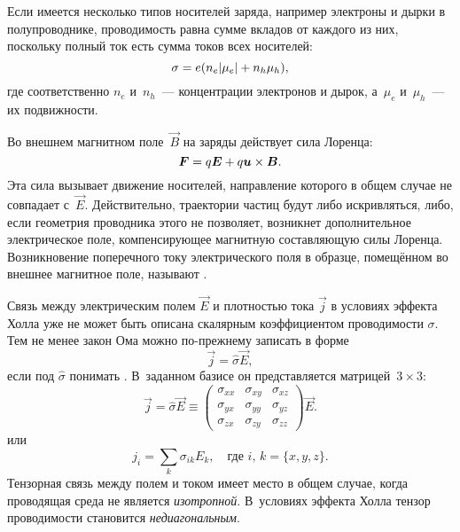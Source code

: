 Если имеется несколько типов носителей заряда, например электроны
и дырки в полупроводнике, проводимость равна сумме вкладов от каждого из них,
поскольку полный ток есть сумма токов всех носителей:
\begin{equation}
    \eqmark{3.27}
    \sigma= e (n_e |\mu_e| +n_h \mu_h),
\end{equation}
где соответственно $n_e$ и~$n_h$~--- концентрации электронов и дырок,
а~$\mu_e$ и~$\mu_h$~--- их подвижности.


\label{sec:halleffect}

Во внешнем магнитном поле~$\vec{B}$ на заряды действует сила Лоренца:
\begin{equation}
\eqmark{F-lorentz}
\vec{F} = q\vec{E}+q\vec{u}\times \vec{B}.
\end{equation}
Эта сила вызывает движение носителей, направление которого
в общем случае не совпадает с~$\vec{E}$.
Действительно, траектории частиц будут либо искривляться,
либо, если геометрия проводника этого не позволяет, возникнет дополнительное электрическое
поле, компенсирующее магнитную составляющую силы Лоренца.
Возникновение поперечного току электрического поля в образце,
помещённом во внешнее магнитное поле, называют .


Связь между электрическим полем $\vec{E}$ и плотностью тока $\vec{j}$ в
условиях эффекта Холла уже не может быть описана скалярным коэффициентом проводимости
$\sigma$. Тем не менее закон Ома можно по-прежнему записать
в форме
\begin{equation}
\vec{j} = \hat{\sigma} \vec{E},
\end{equation}
если под $\hat{\sigma}$
понимать . В~заданном базисе он представляется
матрицей~$3\times 3$:
\begin{equation}
    \vec{j} =\hat{\sigma}\vec{E}\equiv \left(
    \begin{matrix}
     \sigma_{xx} & \sigma_{xy} & \sigma_{xz}\\
     \sigma_{yx} & \sigma_{yy} & \sigma_{yz}\\
     \sigma_{zx} & \sigma_{zy} & \sigma_{zz}
    \end{matrix}
\right) \vec{E}.
\end{equation}
или
\begin{equation*}
    j_{i} = \sum_{k} \sigma_{ik} E_k,\quad \text{где~}i,\,k=\{x,y,z\}.
\end{equation*}
Тензорная связь между полем и током имеет место в общем случае, когда
проводящая среда не является \emph{изотропной}.
В~условиях эффекта Холла тензор проводимости становится \emph{недиагональным}.


